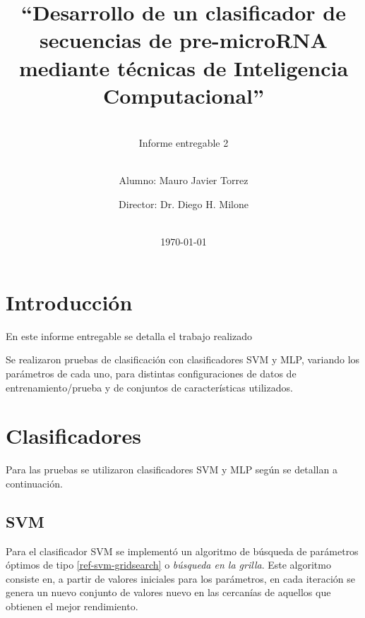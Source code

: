 \documentclass[12pt,bibliography=oldstyle,DIV=12,parskip=half-,titlepage]{scrartcl}
\begin{document}
%
%
\titlehead{\center\large
    Universidad Nacional del Litoral\\
    Facultad de Ingeniería y Ciencias Hídricas
}
%
%
\title{\LARGE ``Desarrollo de un clasificador de secuencias de pre-microRNA
  mediante técnicas de Inteligencia Computacional''}
\subject{Proyecto Final de Carrera\\Ingeniería en
  Informática}
\subtitle{~\\[.2ex]Informe entregable 2\\[.2ex]~}
\author{{Alumno: Mauro Javier Torrez}\and{Director: Dr. Diego H. Milone}}
%
\date{~\\[2em]\today}
%
\renewcommand*{\titlepagestyle}{empty}
\maketitle
\setcounter{page}{1}
%
%
%
%
\section{Introducción}
En este informe entregable se detalla el trabajo realizado \resalt{\ldots}

Se realizaron pruebas de clasificación con clasificadores SVM y MLP,
variando los parámetros de cada uno, para distintas configuraciones de
datos de entrenamiento/prueba y de conjuntos de características
utilizados.

\section{Clasificadores}
Para las pruebas se utilizaron clasificadores SVM y MLP según se
detallan a continuación.
%
\subsection{SVM}
Para el clasificador SVM se implementó un algoritmo de búsqueda de
parámetros óptimos de tipo  \ref{ref-svm-gridsearch}
o \emph{búsqueda en la grilla}.  Este algoritmo consiste en, a partir
de valores iniciales para los parámetros, en cada iteración se genera
un nuevo conjunto de valores nuevo en las cercanías de aquellos que
obtienen el mejor rendimiento.
\end{document}
